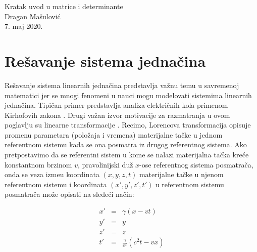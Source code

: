 \documentclass[11pt]{article}
\begin{document}
\begin{center}
    {\LARGE Kratak uvod u matrice i determinante \\}
    \vspace{0.6cm}
    {\Large Dragan Mašulović} \\
    \vspace{0.4cm}
    {\Large 7. maj 2020.}
\end{center}
\vspace{0.5cm}
\begin{abstract}
    Analiziranje rešenja sistema jednačina nas vodi do pojma determinante, čemo je posvećen početak
poglavlja. Nakon toga uvodimo pojam matrice i pokazujemo da je najsločenija i najneintuitivnija
operacija nad matricama, množenje matrica, zapravo posledica analize ponašanja linearnih transformacija.
Rešavanje sistema linearnih jednačina pokazujemo koristeći nekoliko strategija, od kojih neke imaju
samo teorijski značaj, i glavu zaključujemo demonstracijom tehnike za nalaženje inverzne matrice date matrice.
\end{abstract}

\section{Rešavanje sistema jednačina}
Rešavanje sistema linearnih jednačina predstavlja važnu
temu u savremenoj matematici jer se mnogi fenomeni u nauci mogu modelovati
sistemima linearnih jednačina. Tipičan primer predstavlja analiza
električnih kola primenom Kirhofovih zakona \cite{BOYD}.
Drugi važan izvor motivacije za razmatranja u ovom poglavlju su linearne transformacije \cite{AXLER}.
Recimo, Lorencova transformacija opisuje promenu parametara (položaja i vremena) materijalne tačke
u jednom referentnom sistemu kada se ona posmatra iz drugog referentnog sistema. Ako pretpostavimo
da se referentni sistem u kome se nalazi materijalna tačka kreće konstantnom brzinom $v$, pravolinijski
duž $x$-ose referentnog sistema posmatrača, onda se veza izme\dj u koordinata $(x, y, z, t)$ materijalne tačke
u njenom referentnom sistemu i koordinata $(x', y', z', t')$ u referentnom sistemu posmatrača
može opisati na sledeći način:

\begin{eqnarray*}
    x' &=& \gamma(x - vt) \\
    y' &=& y \\
    z' &=& z \\
    t' &=& \frac{\gamma}{c^2}(c^2t - vx)
\end{eqnarray*}
\end{document}
